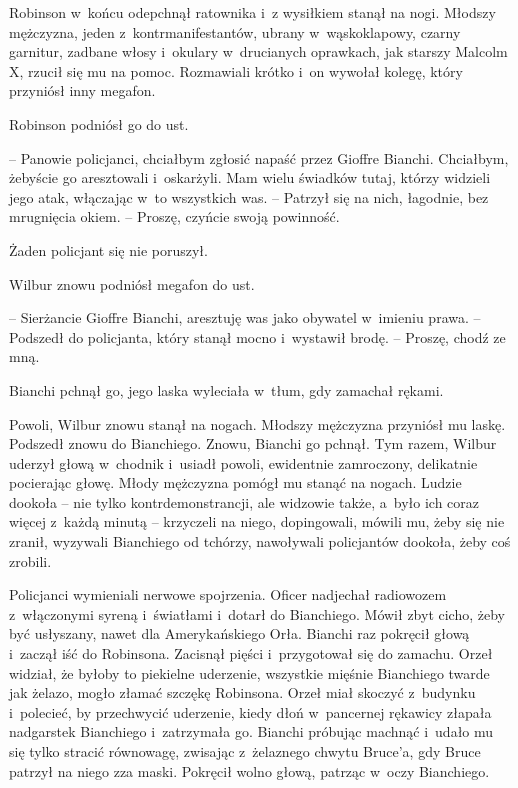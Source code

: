 \documentclass[oneside,polish,11pt,sfheadings]{mwbk}
\begin{document}
Robinson w~końcu odepchnął ratownika i~z wysiłkiem stanął na nogi.
Młodszy mężczyzna, jeden z~kontrmanifestantów, ubrany w~wąskoklapowy,
czarny garnitur, zadbane włosy i~okulary w~drucianych oprawkach, jak
starszy Malcolm X, rzucił się mu na pomoc. Rozmawiali krótko i~on
wywołał kolegę, który przyniósł inny megafon.

Robinson podniósł go do ust.

-- Panowie policjanci, chciałbym zgłosić napaść przez Gioffre Bianchi.
Chciałbym, żebyście go aresztowali i~oskarżyli. Mam wielu świadków
tutaj, którzy widzieli jego atak, włączając w~to wszystkich was. -- Patrzył się na nich, łagodnie, bez mrugnięcia okiem. -- Proszę, czyńcie
swoją powinność.

Żaden policjant się nie poruszył.

Wilbur znowu podniósł megafon do ust. 

-- Sierżancie Gioffre Bianchi,
aresztuję was jako obywatel w~imieniu prawa. -- Podszedł do policjanta,
który stanął mocno i~wystawił brodę. -- Proszę, chodź ze mną.

Bianchi pchnął go, jego laska wyleciała w~tłum, gdy zamachał rękami.

Powoli, Wilbur znowu stanął na nogach. Młodszy mężczyzna przyniósł mu
laskę. Podszedł znowu do Bianchiego. Znowu, Bianchi go pchnął. Tym
razem, Wilbur uderzył głową w~chodnik i~usiadł powoli, ewidentnie
zamroczony, delikatnie pocierając głowę. Młody mężczyzna pomógł mu
stanąć na nogach. Ludzie dookoła -- nie tylko kontrdemonstrancji, ale
widzowie także, a~było ich coraz więcej z~każdą minutą -- krzyczeli na
niego, dopingowali, mówili mu, żeby się nie zranił, wyzywali Bianchiego
od tchórzy, nawoływali policjantów dookoła, żeby coś zrobili.

Policjanci wymieniali nerwowe spojrzenia. Oficer nadjechał radiowozem z~włączonymi syreną i~światłami i~dotarł do Bianchiego. Mówił zbyt cicho,
żeby być usłyszany, nawet dla Amerykańskiego Orła. Bianchi raz pokręcił
głową i~zaczął iść do Robinsona. Zacisnął pięści i~przygotował się do
zamachu. Orzeł widział, że byłoby to piekielne uderzenie, wszystkie
mięśnie Bianchiego twarde jak żelazo, mogło złamać szczękę Robinsona.
Orzeł miał skoczyć z~budynku i~polecieć, by przechwycić uderzenie, kiedy
dłoń w~pancernej rękawicy złapała nadgarstek Bianchiego i~zatrzymała go.
Bianchi próbując machnąć i~udało mu się tylko stracić równowagę,
zwisając z~żelaznego chwytu Bruce'a, gdy Bruce patrzył na niego zza
maski. Pokręcił wolno głową, patrząc w~oczy Bianchiego.
\end{document}
